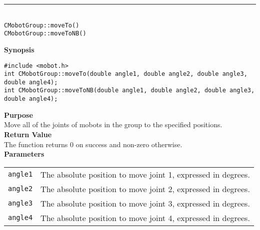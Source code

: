 \noindent
\vspace{5pt}
\rule{4.5in}{0.015in}\\
\noindent
{\LARGE \texttt{CMobotGroup::moveTo()}}\\
{\LARGE \texttt{CMobotGroup::moveToNB()}}\\
{}

\noindent
{\bf Synopsis}
\vspace{-8pt}
\begin{verbatim}
#include <mobot.h>
int CMobotGroup::moveTo(double angle1, double angle2, double angle3, double angle4);
int CMobotGroup::moveToNB(double angle1, double angle2, double angle3, double angle4);
\end{verbatim}

\noindent
{\bf Purpose}\\
Move all of the joints of mobots in the group to the specified positions.\\

\noindent
{\bf Return Value}\\
The function returns 0 on success and non-zero otherwise.\\

\noindent
{\bf Parameters}\\
\vspace{-0.1in}
\begin{description}
\item               
\begin{tabular}{p{15 mm}p{105 mm}}
\texttt{angle1} & The absolute position to move joint 1, expressed in degrees. \\
\texttt{angle2} & The absolute position to move joint 2, expressed in degrees. \\
\texttt{angle3} & The absolute position to move joint 3, expressed in degrees. \\
\texttt{angle4} & The absolute position to move joint 4, expressed in degrees. \\
\end{tabular}
\end{description}
\noindent

